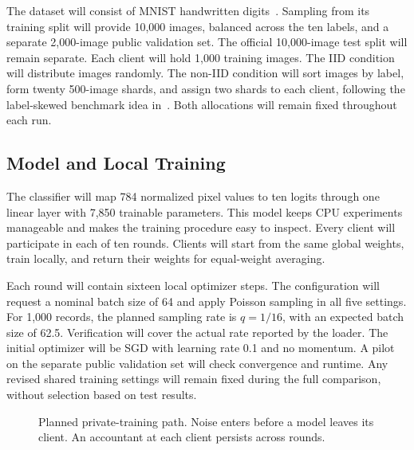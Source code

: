 \documentclass[nolineno]{ieeeaccess}
\begin{document}
The dataset will consist of MNIST handwritten digits~\cite{lecun}. Sampling from its training split will provide 10,000 images, balanced across the ten labels, and a separate 2,000-image public validation set. The official 10,000-image test split will remain separate. Each client will hold 1,000 training images. The IID condition will distribute images randomly. The non-IID condition will sort images by label, form twenty 500-image shards, and assign two shards to each client, following the label-skewed benchmark idea in~\cite{mcmahan}. Both allocations will remain fixed throughout each run.

\subsection{Model and Local Training}
The classifier will map 784 normalized pixel values to ten logits through one linear layer with 7,850 trainable parameters. This model keeps CPU experiments manageable and makes the training procedure easy to inspect. Every client will participate in each of ten rounds. Clients will start from the same global weights, train locally, and return their weights for equal-weight averaging.

Each round will contain sixteen local optimizer steps. The configuration will request a nominal batch size of 64 and apply Poisson sampling in all five settings. For 1,000 records, the planned sampling rate is $q=1/16$, with an expected batch size of 62.5. Verification will cover the actual rate reported by the loader. The initial optimizer will be SGD with learning rate 0.1 and no momentum. A pilot on the separate public validation set will check convergence and runtime. Any revised shared training settings will remain fixed during the full comparison, without selection based on test results.

\begin{figure}[t]
\centering
{}
\caption{Planned private-training path. Noise enters before a model leaves its client. An accountant at each client persists across rounds.}
\label{fig:pipeline}
\end{figure}
\end{document}
